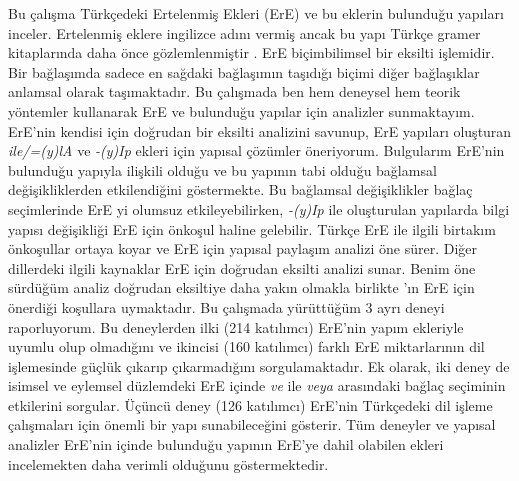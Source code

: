 Bu çalışma Türkçedeki Ertelenmiş Ekleri (ErE) ve bu eklerin bulunduğu yapıları inceler. Ertelenmiş eklere ingilizce adını \cite{geoffrey1967turkish} vermiş ancak bu yapı Türkçe gramer kitaplarında daha önce gözlemlenmiştir \citep{emre1945turk,gencan1966dilbilgisi}. ErE biçimbilimsel bir eksilti işlemidir. Bir bağlaşımda sadece en sağdaki bağlaşımın taşıdığı biçimi diğer bağlaşıklar anlamsal olarak taşımaktadır. Bu çalışmada ben hem deneysel hem teorik yöntemler kullanarak ErE ve bulunduğu yapılar için analizler sunmaktayım. ErE'nin kendisi için doğrudan bir eksilti analizini savunup, ErE yapıları oluşturan \textit{ile/=(y)lA} ve \textit{-(y)Ip} ekleri için yapısal çözümler öneriyorum. Bulgularım ErE'nin bulunduğu yapıyla ilişkili olduğu ve bu yapının tabi olduğu bağlamsal değişikliklerden etkilendiğini göstermekte. Bu bağlamsal değişiklikler bağlaç seçimlerinde ErE yi olumsuz etkileyebilirken, \textit{-(y)Ip} ile oluşturulan yapılarda bilgi yapısı değişikliği ErE için önkoşul haline gelebilir. Türkçe ErE ile ilgili \cite{kabak2007turkish} birtakım önkoşullar ortaya koyar ve \cite{orgun1995flat,kornfilt2012revisiting,broadwell2008turkish} ErE için yapısal paylaşım analizi öne sürer. Diğer dillerdeki ilgili kaynaklar \citep{guseva2017postsyntactic,erschler2018suspended} ErE için doğrudan eksilti analizi sunar. Benim öne sürdüğüm analiz doğrudan eksiltiye daha yakın olmakla birlikte \cite{kabak2007turkish}'ın ErE için önerdiği koşullara uymaktadır. Bu çalışmada yürüttüğüm 3 ayrı deneyi raporluyorum. Bu deneylerden ilki (214 katılımcı) ErE'nin yapım ekleriyle uyumlu olup olmadığını ve ikincisi (160 katılımcı) farklı ErE miktarlarının dil işlemesinde güçlük çıkarıp çıkarmadığını sorgulamaktadır. Ek olarak, iki deney de isimsel ve eylemsel düzlemdeki ErE içinde \textit{ve} ile \textit{veya} arasındaki bağlaç seçiminin etkilerini sorgular. Üçüncü deney (126 katılımcı) ErE'nin Türkçedeki dil işleme çalışmaları için önemli bir yapı sunabileceğini gösterir. Tüm deneyler ve yapısal analizler ErE'nin içinde bulunduğu yapının ErE'ye dahil olabilen ekleri incelemekten daha verimli olduğunu göstermektedir.